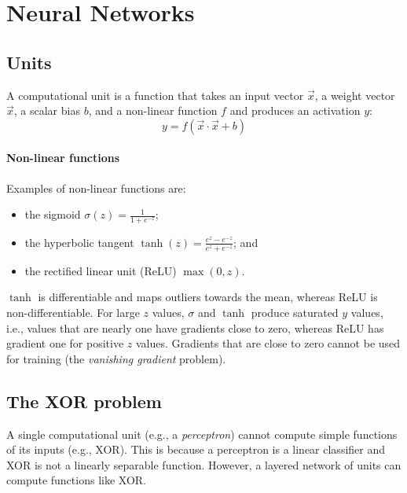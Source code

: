 \section{Neural Networks}

\subsection{Units}

\begin{dfn}
  \label{dfn:7:ComputationalUnit}
  A computational unit is a function that takes an input vector $\vec{x}$, a
  weight vector $\vec{x}$, a scalar bias $b$, and a non-linear function $f$ and
  produces an activation $y$:
  \begin{equation}
    y = f(\vec{x} \cdot \vec{x} + b)
  \end{equation}
\end{dfn}

\paragraph{Non-linear functions}

Examples of non-linear functions are:
\begin{itemize}
  \item the sigmoid $\sigma(z) = \frac{1}{1 + e^{-z}}$;
  \item the hyperbolic tangent $\tanh(z) = \frac{e^z - e^{-z}}{e^z + e^{-z}}$; and
  \item the rectified linear unit (ReLU) $\max(0, z)$.
\end{itemize}

$\tanh$ is differentiable and maps outliers towards the mean, whereas ReLU is
non-differentiable.
For large $z$ values, $\sigma$ and $\tanh$ produce saturated $y$ values, i.e.,
values that are nearly one have gradients close to zero, whereas ReLU has
gradient one for positive $z$ values.
Gradients that are close to zero cannot be used for training (the
\textit{vanishing gradient} problem).

\subsection{The XOR problem}

A single computational unit (e.g., a \textit{perceptron}) cannot compute simple
functions of its inputs (e.g., XOR).
This is because a perceptron is a linear classifier and XOR is not a linearly
separable function.
However, a layered network of units can compute functions like XOR.

